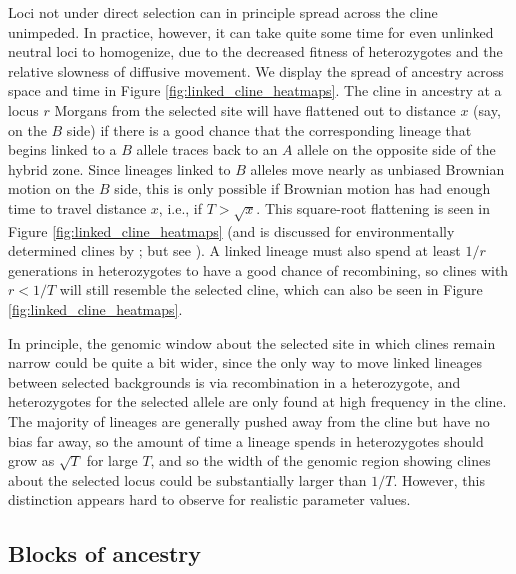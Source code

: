 \documentclass[11pt,letterpaper]{article}
\begin{document}
Loci not under direct selection can in principle spread across the cline unimpeded. 
In practice, however, it can take quite some time for even unlinked neutral loci to homogenize,
due to the decreased fitness of heterozygotes \citep{barton1986barrier}
and the relative slowness of diffusive movement.
We display the spread of ancestry across space and time in Figure \ref{fig:linked_cline_heatmaps}. 
The cline in ancestry at a locus $r$ Morgans from the selected site
will have flattened out to distance $x$ (say, on the $B$ side)
if there is a good chance that the corresponding lineage that begins linked to a $B$ allele
traces back to an $A$ allele on the opposite side of the hybrid zone.
Since lineages linked to $B$ alleles move nearly as unbiased Brownian motion on the $B$ side,
this is only possible if Brownian motion has had enough time to travel distance $x$,
i.e., if $T>\sqrt{x}$.
This square-root flattening is seen in Figure \ref{fig:linked_cline_heatmaps}
(and is discussed for environmentally determined clines by \citet{may1975gene}; but see \citet{durrett2007width}). 
A linked lineage must also spend at least $1/r$ generations in heterozygotes
to have a good chance of recombining,
so clines with $r<1/T$ will still resemble the selected cline,
which can also be seen in Figure \ref{fig:linked_cline_heatmaps}.


In principle, the genomic window about the selected site
in which clines remain narrow could be quite a bit wider,
since the only way to move linked lineages between selected backgrounds is via recombination in a heterozygote,
and heterozygotes for the selected allele are only found at high frequency in the cline.
The majority of lineages are generally pushed away from the cline but have no bias far away,
so the amount of time a lineage spends in heterozygotes should grow as $\sqrt{T}$ for large $T$,
and so the width of the genomic region showing clines about the selected locus could be 
substantially larger than $1/T$. However, this distinction appears hard to observe for realistic parameter values.






\subsection*{Blocks of ancestry}
\end{document}
